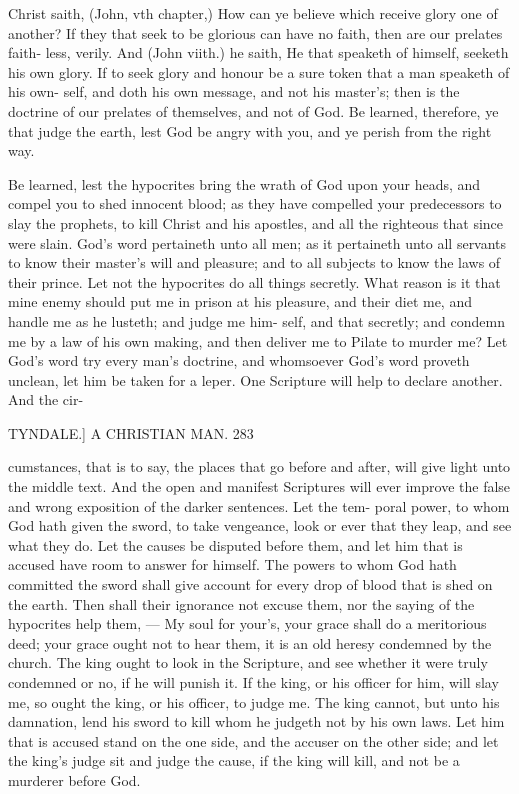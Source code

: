 \documentclass{custom}
\begin{document}
{{Christ saith, (John, vth chapter,) How can ye believe 
which receive glory one of another? If they that seek to 
be glorious can have no faith, then are our prelates faith- 
less, verily. And (John viith.) he saith, He that speaketh 
of himself, seeketh his own glory. If to seek glory and 
honour be a sure token that a man speaketh of his own- 
self, and doth his own message, and not his master's; 
then is the doctrine of our prelates of themselves, and not 
of God. Be learned, therefore, ye that judge the earth, 
lest God be angry with you, and ye perish from the right 
way. 

Be learned, lest the hypocrites bring the wrath of God 
upon your heads, and compel you to shed innocent blood; 
as they have compelled your predecessors to slay the 
prophets, to kill Christ and his apostles, and all the 
righteous that since were slain. God's word pertaineth 
unto all men; as it pertaineth unto all servants to know 
their master's will and pleasure; and to all subjects to 
know the laws of their prince. Let not the hypocrites do 
all things secretly. What reason is it that mine enemy 
should put me in prison at his pleasure, and their diet 
me, and handle me as he lusteth; and judge me him- 
self, and that secretly; and condemn me by a law of his 
own making, and then deliver me to Pilate to murder me? 
Let God's word try every man's doctrine, and whomsoever 
God's word proveth unclean, let him be taken for a leper. 
One Scripture will help to declare another. And the cir- 


TYNDALE.]
A CHRISTIAN MAN.
283

cumstances, that is to say, the places that go before and 
after, will give light unto the middle text. And the open 
and manifest Scriptures will ever improve the false and 
wrong exposition of the darker sentences. Let the tem- 
poral power, to whom God hath given the sword, to take 
vengeance, look or ever that they leap, and see what they 
do. Let the causes be disputed before them, and let him 
that is accused have room to answer for himself. The 
powers to whom God hath committed the sword shall give 
account for every drop of blood that is shed on the 
earth. Then shall their ignorance not excuse them, nor 
the saying of the hypocrites help them, — My soul for 
your's, your grace shall do a meritorious deed; your 
grace ought not to hear them, it is an old heresy 
condemned by the church. The king ought to look in 
the Scripture, and see whether it were truly condemned 
or no, if he will punish it. If the king, or his officer for 
him, will slay me, so ought the king, or his officer, to 
judge me. The king cannot, but unto his damnation, 
lend his sword to kill whom he judgeth not by his own 
laws. Let him that is accused stand on the one side, and 
the accuser on the other side; and let the king's judge sit 
and judge the cause, if the king will kill, and not be a 
murderer before God. 

}}
\end{document}
